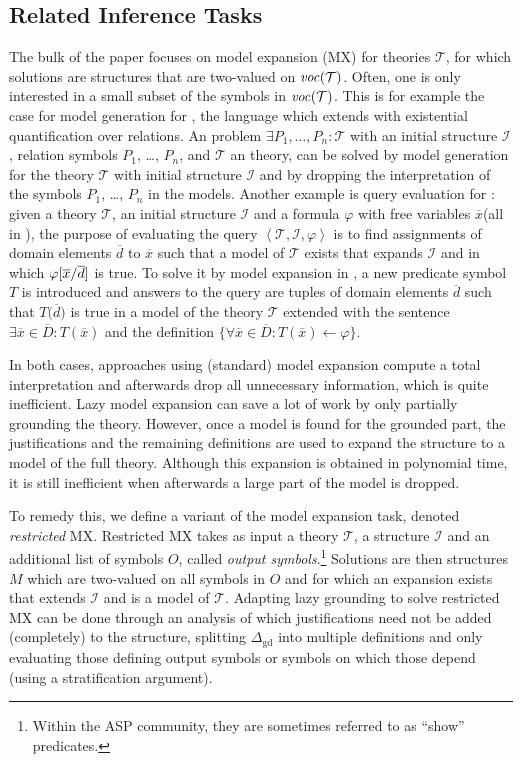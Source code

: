 \documentclass[11pt]{article}
\newcommand{\m}[1]{\ensuremath{#1}\xspace}
\newcommand{\lrule}{\m{\leftarrow}}
\newcommand{\I}{\m{\mathcal{I}}}
\newcommand{\theory}{\m{\mathcal{T}}}
\newcommand{\D}{\m{\Delta}}
\newcommand{\xxx}{\m{\overline{x}}}
\newcommand{\ddd}{\m{\overline{d}}}
\newcommand{\bracketddd}{\m{\big(\overline{d}\big)}}
\newcommand{\DDD}{\m{\overline{D}}}
\newcommand{\typed}[2]{\m{#1\in #2:}}
\newcommand{\tuple}[1]{\m{\left \langle #1 \right \rangle }}
\newcommand{\logicname}[1]{\text{\sc #1}\xspace}
\newcommand{\foid}{\logicname{FO(\ensuremath{ID})}}
\newcommand{\esoid}{\logicname{\ensuremath{\exists}SO(\ensuremath{ID})}}
\theoremstyle{plain}
\theoremstyle{definition}
\theoremstyle{example_basic}
\theoremstyle{example_contd}
\theoremstyle{plain}
\newcommand{\Dgd}{\ensuremath{\D_\text{gd}}\xspace}
\begin{document}
\subsection{Related Inference Tasks}\label{sec:reltasks}
The bulk of the paper focuses on model expansion (MX) for
  \foid theories \theory, for which solutions are structures that are
  two-valued on $\vocf{\theory}$.  Often, one is only interested in a
  small subset of the symbols in $\vocf{\theory}$. This is for example
  the case for model generation for \esoid, the language which extends
  \foid with existential quantification over relations. An \esoid
  problem $\exists P_1, \ldots, P_n: \theory$ with an initial
  structure \I, relation symbols $P_1$, \ldots, $P_n$, and
  \theory an \foid theory, can be solved by model generation for the
  \foid theory $\theory$ with initial structure \I and by
  dropping the interpretation of the symbols $P_1$, \ldots, $P_n$ in
  the models. Another example is query evaluation for \foid: given a
  theory \theory, an initial structure \I and a formula $\varphi$
  with free variables \xxx (all in \foid), the purpose of evaluating
  the query $\tuple{\theory, \I, \varphi}$ is to find
  assignments of domain elements \ddd  to \xxx such that a model of
  \theory exists that expands \I and in which
  $\varphi[\xxx\subs\ddd]$ is true. To solve it by model expansion
  in \foid, a new predicate symbol $T$ is introduced and answers to the query
  are tuples of domain elements $\ddd$ such that $T\bracketddd$ is
  true in a model of the theory $\theory$ extended with the sentence $\exists
  \typed{\xxx}{\DDD} T(\xxx)$ and the definition $\{\forall \typed{\xxx}{\DDD} T(\xxx) \lrule \varphi\}$.

In both cases, approaches using (standard) model expansion compute a total
  interpretation and afterwards drop all unnecessary information,
  which is quite inefficient. Lazy model expansion can save a lot
  of work by only partially grounding the theory. However, once a
  model is found for the grounded part, the justifications and the
  remaining definitions are used to expand the structure to a model of the
  full theory. Although this expansion is obtained in polynomial time,
  it is still inefficient when afterwards a large part of the model is
  dropped.

To remedy this, we define a variant of the model expansion task, denoted \emph{restricted} MX. Restricted MX takes as input a theory \theory, a structure \I and an additional list of symbols $O$, called \emph{output symbols}.\footnote{Within the ASP community, they are sometimes referred to as ``show'' predicates.} Solutions are then structures $M$ which are two-valued on all symbols in $O$ and for which an expansion exists that extends \I and is a model of \theory. Adapting lazy grounding to solve restricted MX can be done through an analysis of which justifications need not be added (completely) to the structure, splitting \Dgd into multiple definitions and only evaluating those defining output symbols or symbols on which those depend (using a stratification argument).
\end{document}
